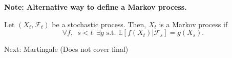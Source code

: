 \documentclass[12pt]{report}
\newcommand{\F}{\mathcal{F}}
\newcommand{\E}{\mathbb{E}}
\renewcommand{\1}{\mathbb{1}}
\theoremstyle{break}
\theoremstyle{newdef}
\theoremstyle{remark}
\begin{document}
\vspace{5mm}

\textbf{Note: Alternative way to define a Markov process.}

Let $(X_t, \F_t)$ be a stochastic process.
Then, $X_t$ is a Markov process if
\[\forall f, \enspace s < t \enspace \exists g \text{ s.t. } \E[f(X_t) | \F_s] = g(X_s).\]

Next: Martingale (Does not cover final)


















\end{document}
